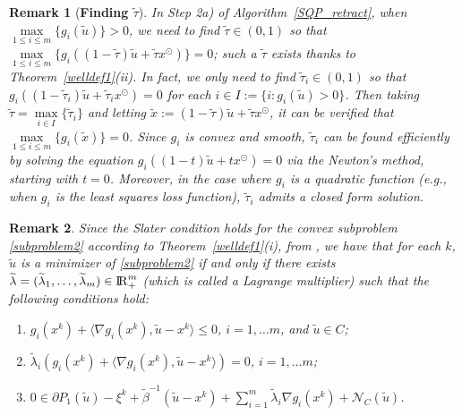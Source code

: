\documentclass[10pt]{article}
\numberwithin{equation}{section}
\newtheorem{remark}{Remark}[section]
\def\R{{\rm I\!R}}
\def\xfeas{x^\odot}
\begin{document}
\begin{remark}[{{\bf Finding $\widetilde\tau$}}]
  In Step 2a) of Algorithm~\ref{SQP_retract}, when $\max\limits_{1 \le i \le m} \{g_i(\widetilde u)\} > 0$, we need to find $\widetilde\tau\in(0,1)$ so that $\max\limits_{1 \le i \le m} \{g_i((1-\widetilde\tau)\widetilde u + \widetilde\tau \xfeas)\} = 0$; such a $\widetilde\tau$ exists thanks to Theorem~\ref{welldef1}(ii). In fact, we only need to find $\widetilde\tau_i\in(0,1)$ so that $g_i((1-\widetilde\tau_i)\widetilde u + \widetilde\tau_i \xfeas) = 0$ for each $i\in I:= \{i: g_i(\widetilde{u}) > 0\}$. Then taking $\widetilde{\tau} = \max\limits_{i\in I}\{\widetilde{\tau}_i\}$ and letting $\widetilde{x} := (1 - \widetilde{\tau})\widetilde{u} + \widetilde{\tau} \xfeas$, it can be verified that $\max\limits_{1 \le i \le m} \{g_i(\widetilde{x})\} = 0$. Since $g_i$ is convex and smooth,  $\widetilde\tau_i$ can be found efficiently by solving the equation $g_i((1-t)\widetilde u + t \xfeas) = 0$ via the Newton's method, starting with $t = 0$. Moreover, in the case where $g_i$ is a quadratic function (e.g., when $g_i$ is the least squares loss function), $\widetilde\tau_i$ admits a closed form solution.
\end{remark}

\begin{remark}\label{KKT}
Since the Slater condition holds for the convex subproblem \eqref{subproblem2} according to Theorem~\ref{welldef1}(i), from \cite[Corollary~28.2.1,
Theorem~28.3]{Ro70}, we have that for each $k$, $\widetilde{u}$ is a minimizer of \eqref{subproblem2} if and only if
there exists $\widetilde\lambda = (\widetilde\lambda_1,\ldots,\widetilde\lambda_m)\in \R_+^m$ (which is called a Lagrange multiplier) such that the following conditions hold:
\begin{enumerate}[{\rm (i)}]
  \item  $g_i(x^k) + \langle \nabla g_i(x^k), \widetilde{u} - x^k\rangle \leq 0$, $i = 1, \ldots m$, and $\widetilde{u}\in C$;
  \item  $\widetilde\lambda_i(g_i(x^k) + \langle \nabla g_i(x^k), \widetilde{u} - x^k\rangle)=0$, $i = 1, \ldots m$;
  \item  $0\in\partial P_1(\widetilde{u}) - \xi^k + \widetilde\beta^{-1}(\widetilde{u} - x^k) + \sum\limits_{i=1}^m\widetilde\lambda_i\nabla g_i(x^k) + \mathcal{N}_C(\widetilde{u})$.
\end{enumerate}
\end{remark}
\end{document}
